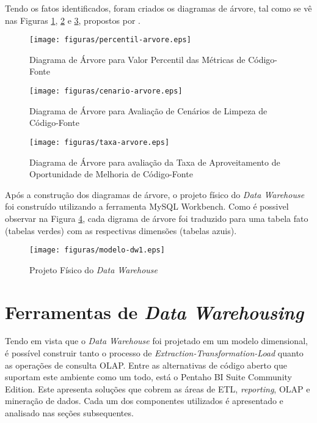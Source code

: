 Tendo os fatos identificados, foram criados os diagramas de árvore, tal como se vê nas Figuras \ref{fig:percentil-arvore}, \ref{fig:cenario-arvore} e \ref{fig:taxa-arvore},  propostos por .

\begin{figure}[ht!]
\centering
\texttt{[image: figuras/percentil-arvore.eps]}
\caption{Diagrama de Árvore para Valor Percentil das Métricas de Código-Fonte}
\label{fig:percentil-arvore}
\end{figure}
\FloatBarrier


\begin{figure}[ht!]
\centering
\texttt{[image: figuras/cenario-arvore.eps]}
\caption{Diagrama de Árvore para Avaliação de Cenários de Limpeza de Código-Fonte}
\label{fig:cenario-arvore}
\end{figure}
\FloatBarrier



\begin{figure}[ht!]
\centering
\texttt{[image: figuras/taxa-arvore.eps]}
\caption{Diagrama de Árvore para avaliação da Taxa de Aproveitamento de Oportunidade de Melhoria de Código-Fonte}
\label{fig:taxa-arvore}
\end{figure}
\FloatBarrier


Após a construção dos diagramas de árvore, o projeto físico do \textit{Data Warehouse} foi construído utilizando a ferramenta MySQL Workbench. Como é possivel observar na Figura \ref{fig:project-dw}, cada digrama de árvore foi traduzido para uma tabela fato (tabelas verdes) com as respectivas dimensões (tabelas azuis). 




\begin{figure}[ht!]
\centering
\texttt{[image: figuras/modelo-dw1.eps]}
\caption{Projeto Físico do \textit{Data Warehouse}}
\label{fig:project-dw}
\end{figure}
\FloatBarrier


\section{Ferramentas de \textit{Data Warehousing}}

Tendo em vista que o \textit{Data Warehouse} foi projetado em um modelo dimensional, é possível construir tanto o processo de \textit{Extraction-Transformation-Load} quanto as operações de consulta OLAP. Entre as alternativas de código aberto que suportam este ambiente como um todo, está o Pentaho BI Suite Community Edition. Este apresenta soluções que cobrem 
as áreas de ETL, \textit{reporting}, OLAP e mineração de dados. Cada um dos componentes utilizados é apresentado e analisado nas seções subsequentes.
 


